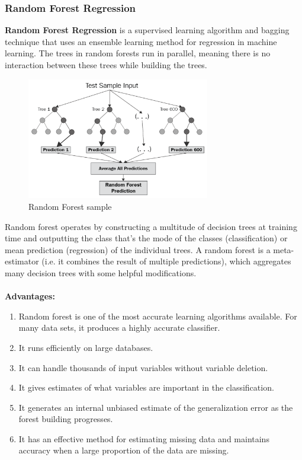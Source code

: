 \documentclass[a4paper]{article}
\theoremstyle{definition}
\begin{document}
\subsubsection{Random Forest Regression}
\textbf{Random Forest Regression} is a supervised learning algorithm and bagging technique that uses an ensemble learning method for regression in machine learning. The trees in random forests run in parallel, meaning there is no interaction between these trees while building the trees.
\begin{figure}[h!]
\begin{center}
\includegraphics[width=8cm]{images/example1.jpg}
\end{center}
\caption{Random Forest sample}
\end{figure}

Random forest operates by constructing a multitude of decision trees at training time and outputting the class that’s the mode of the classes (classification) or mean prediction (regression) of the individual trees.
A random forest is a meta-estimator (i.e. it combines the result of multiple predictions), which aggregates many decision trees with some helpful modifications.\\
\\
\textbf{Advantages:}
\begin{enumerate}
    \item Random forest is one of the most accurate learning algorithms available. For many data sets, it produces a highly accurate classifier.
    \item It runs efficiently on large databases.
    \item It can handle thousands of input variables without variable deletion.
    \item It gives estimates of what variables are important in the classification.
    \item It generates an internal unbiased estimate of the generalization error as the forest building progresses.
    \item It has an effective method for estimating missing data and maintains accuracy when a large proportion of the data are missing.
\end{enumerate}
\end{document}
